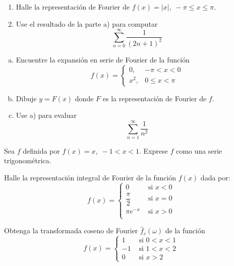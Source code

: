 \documentclass[11pt]{article}
\begin{document}
\begin{question} %
	\begin{enumerate}[ a) ]
		\item Halle la representación de Fourier de $f(x) = |x|, \; -\pi \leq x \leq \pi$.
		\item Use el resultado de la parte a) para computar
		      \[ \sum_{n = 0}^{\infty} \frac{1}{(2 n + 1)^2} \]
	\end{enumerate}
\end{question}

\begin{question} %
	\begin{enumerate}[a)]
		\item Encuentre la expansión en serie de Fourier de la función
		      \[ f(x) =
			      \begin{cases}
				      0,   & -\pi < x < 0   \\
				      x^2, & 0 \leq x < \pi
			      \end{cases} \]
		\item Dibuje $y = F(x)$ donde $F$ es la representación de Fourier de $f$.
		\item Use a) para evaluar
		      \[ \sum_{n = 1}^{\infty} \frac{1}{n^2} \]
	\end{enumerate}
\end{question}

\begin{question} %
	Sea $f$ definida por $f(x) = x, \; -1 < x < 1$. Exprese $f$ como una serie trigonométrica.
\end{question}

\begin{question} %
	Halle la representación integral de Fourier de la función $f(x)$ dada por:
	\[ f(x) =
		\begin{cases}
			0              & \text{ si } x < 0 \\
			\dfrac{\pi}{2} & \text{ si } x = 0 \\
			\pi e^{-x}     & \text{ si } x > 0 \\
		\end{cases} \]
\end{question}


\begin{question} %
	Obtenga la transformada coseno de Fourier $\hat{f}_c(\omega)$ de la función
	\[ f(x) =
		\begin{cases}
			1  & \text{ si } 0 < x < 1 \\
			-1 & \text{ si } 1 < x < 2 \\
			0  & \text{ si } x > 2
		\end{cases} \]
\end{question}
\end{document}
